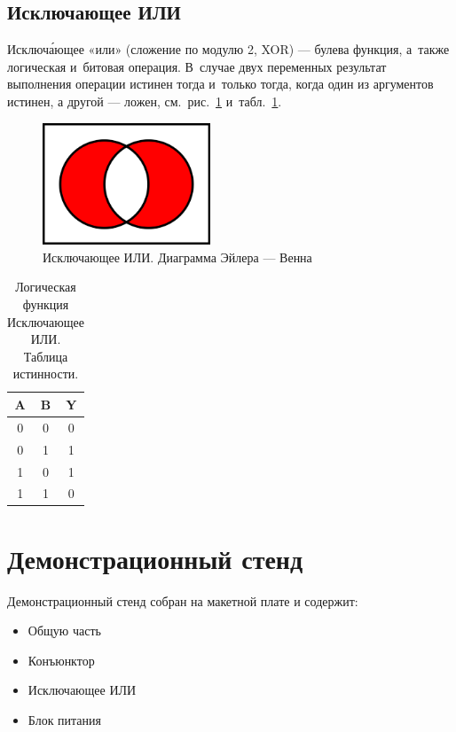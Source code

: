 \documentclass[a4paper,12pt]{article}
\begin{document}
\subsection{Исключающее ИЛИ}

Исключ\'{а}ющее «или» (сложение по модулю 2, XOR) — булева функция, а~также логическая и~битовая операция. В~случае двух переменных результат выполнения операции истинен тогда и~только тогда, когда один из аргументов истинен, а другой — ложен, см.~рис.~\ref{xor} и~табл.~\ref{XOR_table}.

\begin{figure}[h]
    \begin{center}
    \includegraphics[width=5cm]{xor}    
    \caption{Исключающее ИЛИ. Диаграмма Эйлера — Венна}
    \label{xor}
    \end{center}
\end{figure}

\begin{table}[h!]
    \caption{Логическая функция Исключающее ИЛИ. Таблица истинности.\label{XOR_table}}
    \begin{center}
    \begin{tabular}{||c c c||} 
     \hline
     A & B & Y \\ [0.5ex] 
     \hline\hline
     0 & 0 & 0 \\ 
     \hline
     0 & 1 & 1 \\
     \hline
     1 & 0 & 1 \\
     \hline
     1 & 1 & 0 \\ 
     \hline
    \end{tabular}
    \end{center}
\end{table}

\section{Демонстрационный стенд}

Демонстрационный стенд собран на макетной плате и содержит:
\begin{itemize}
    \item Общую часть
    \item Конъюнктор
    \item Исключающее ИЛИ
    \item Блок питания
\end{itemize}
\end{document}
